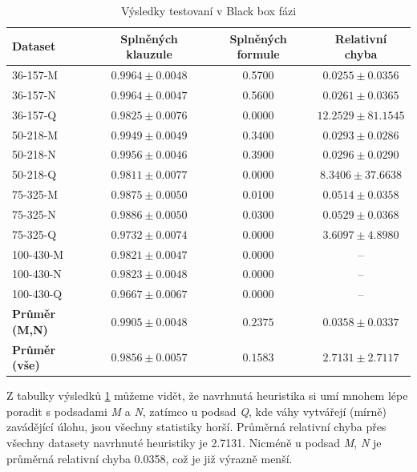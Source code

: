 \documentclass[12pt]{article}
\begin{document}
\begin{table}[h!]
    \centering
    \caption{Výsledky testovaní v Black box fázi}
    \renewcommand{\arraystretch}{1.2} %
    \begin{tabular}{|l|c|c|c|}
        \hline
        \textbf{Dataset} & \textbf{Splněných klauzule} & \textbf{Splněných formule} & \textbf{Relativní chyba} \\
        \hline
        36-157-M  & $0.9964 \pm 0.0048$ & 0.5700  & $0.0255 \pm 0.0356$ \\
        36-157-N  & $0.9964 \pm 0.0047$ & 0.5600  & $0.0261 \pm 0.0365$ \\
        36-157-Q  & $0.9825 \pm 0.0076$ & 0.0000  & $12.2529 \pm 81.1545$ \\
        50-218-M  & $0.9949 \pm 0.0049$ & 0.3400  & $0.0293 \pm 0.0286$ \\
        50-218-N  & $0.9956 \pm 0.0046$ & 0.3900  & $0.0296 \pm 0.0290$ \\
        50-218-Q  & $0.9811 \pm 0.0077$ & 0.0000  & $8.3406 \pm 37.6638$ \\
        75-325-M  & $0.9875 \pm 0.0050$ & 0.0100  & $0.0514 \pm 0.0358$ \\
        75-325-N  & $0.9886 \pm 0.0050$ & 0.0300  & $0.0529 \pm 0.0368$ \\
        75-325-Q  & $0.9732 \pm 0.0074$ & 0.0000  & $3.6097 \pm 4.8980$ \\
        100-430-M & $0.9821 \pm 0.0047$ & 0.0000  & -- \\
        100-430-N & $0.9823 \pm 0.0048$ & 0.0000  & -- \\
        100-430-Q & $0.9667 \pm 0.0067$ & 0.0000  & -- \\
        \hline
        \textbf{Průměr (M,N)} & $\mathbf{0.9905 \pm 0.0048}$ & $\mathbf{0.2375}$ & $\mathbf{0.0358 \pm 0.0337}$ \\
        \hline
        \textbf{Průměr (vše)} & $\mathbf{0.9856 \pm 0.0057}$ & $\mathbf{0.1583}$ & $\mathbf{2.7131 \pm 2.7117}$ \\
        \hline
    \end{tabular}
    \label{tab:black_box_results}
\end{table}


Z tabulky výsledků \ref{tab:black_box_results} můžeme vidět, že navrhnutá heuristika si umí mnohem lépe poradit s podsadami \textit{M} a \textit{N}, zatímco u podsad \textit{Q}, kde váhy vytvářejí (mírně) zavádějící úlohu, jsou všechny statistiky horší. Průměrná relativní chyba přes všechny datasety navrhnuté heuristiky je 2.7131. Nicméně u podsad \textit{M}, \textit{N} je průměrná relativní chyba 0.0358, což je již výrazně menší.
\end{document}

